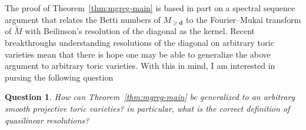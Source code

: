 \documentclass[11pt,reqno]{amsart}
\newtheorem{question}[lemma]{Question}
\theoremstyle{remark}
\newcommand{\Tor}{\operatorname{Tor}}
\renewcommand{\aa}{\mathbf a}
\newcommand{\dd}{\mathbf d}
\newcommand{\nn}{\mathbf n}
\renewcommand{\O}{\mathcal{O}}
\newcommand{\C}{\mathbb{C}}
\renewcommand{\P}{\mathbb{P}}
\newcommand{\Z}{\mathbb{Z}}
\begin{document}
The proof of Theorem~\ref{thm:mgreg-main} is based in part on a spectral sequence argument that relates the Betti numbers of $M_{\geq\dd}$ to the Fourier--Mukai transform of $\widetilde{M}$ with Beilinson's resolution of the diagonal as the kernel.  Recent breakthroughs \cite{HHL23, brownErman23-2} understanding resolutions of the diagonal on arbitrary toric varieties mean that there is hope one may be able to generalize the above argument to arbitrary toric varieties. With this in mind, I am interested in pursing the following question


\begin{question}
How can Theorem~\ref{thm:mgreg-main} be generalized to an arbitrary smooth projective toric varieties? in particular, what is the correct definition of quasilinear resolutions?
\end{question}

%
%
%
%
\end{document}
